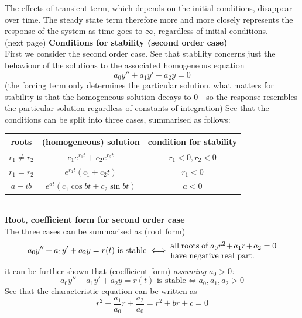 \documentclass{report}
\begin{document}
The effects of transient term, which depends on the initial conditions, disappear over time. 
The steady state term therefore more and more closely represents the response of the system as time goes to $\infty$, regardless of initial conditions.\\
(next page)
\newpage
\noindent\textbf{Conditions for stability (second order case)}\\
First we consider the second order case. See that stability concerns just the behaviour of the solutions to
the associated homogeneous equation
\begin{equation*}
a_0y''+a_1y'+a_2y=0
\end{equation*}
(the forcing term only determines the particular solution. what matters for stability is that the homogeneous
solution decays to 0---so the response resembles the particular solution regardless of constants of integration) 
See that the conditions can be split into three cases, summarised as follows:
\begin{table}[h]
\begin{center}
\begin{tabular}{c c c}
\hline
roots & (homogeneous) solution & condition for stability\\
\hline
$r_1\neq r_2$&$c_1e^{r_1t}+c_2e^{r_2t}$&$r_1<0,r_2<0$\\
$r_1=r_2$&$e^{r_1t}(c_1+c_2t)$&$r_1<0$\\
$a\pm ib$&$e^{at}(c_1\cos bt+c_2\sin bt)$&$a<0$\\
\hline
\end{tabular}
\end{center}
\end{table}\\
\textbf{Root, coefficient form for second order case}\\
The three cases can be summarised as (root form)
\begin{equation*}
a_0y''+a_1y'+a_2y=r(t)\text{ is stable}\iff\parbox{13em}{all roots of $a_0r^2+a_1r+a_2=0$\\
have negative real part.}
\end{equation*}
it can be further shown that (coefficient form) \textit{assuming $a_0>0$:}
\begin{equation*}
a_0y''+a_1y'+a_2y=r(t)\text{ is stable}\iff a_0,a_1,a_2>0
\end{equation*}
See that the characteristic equation can be written as
\begin{equation*}
r^2+\frac{a_1}{a_0}r+\frac{a_2}{a_0}=r^2+br+c=0
\end{equation*}
\end{document}
